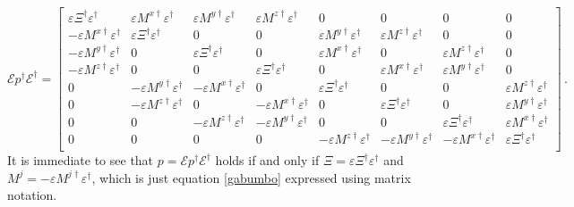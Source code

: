\documentclass[a4paper, amsfonts, amssymb, amsmath, reprint, showkeys, nofootinbib, twoside, onecolumn,notitlepage]{revtex4-1}
\begin{document}
\begin{equation}
\mathcal{E}p^\dagger\mathcal{E}^\dagger = 
\begin{bmatrix}
\varepsilon \Xi^\dagger \varepsilon^\dagger &  \varepsilon M^{x\dagger}\varepsilon^\dagger & \varepsilon M^{y\dagger}\varepsilon^\dagger & \varepsilon M^{z\dagger}\varepsilon^\dagger & 0 & 0 & 0 & 0\\
-\varepsilon M^{x\dagger} \varepsilon^\dagger & \varepsilon \Xi^\dagger \varepsilon^\dagger  & 0 & 0 & \varepsilon M^{y\dagger} \varepsilon^\dagger & \varepsilon M^{z\dagger} \varepsilon^\dagger & 0 & 0\\
-\varepsilon M^{y\dagger} \varepsilon^\dagger & 0 & \varepsilon \Xi^\dagger \varepsilon^\dagger  & 0 & \varepsilon M^{x\dagger} \varepsilon^\dagger & 0 & \varepsilon M^{z\dagger} \varepsilon^\dagger & 0\\
-\varepsilon M^{z\dagger} \varepsilon^\dagger & 0 & 0 & \varepsilon \Xi^\dagger \varepsilon^\dagger  & 0 & \varepsilon M^{x\dagger} \varepsilon^\dagger &  \varepsilon M^{y\dagger} \varepsilon^\dagger & 0\\
0 & -\varepsilon M^{y\dagger} \varepsilon^\dagger & - \varepsilon M^{x\dagger} \varepsilon^\dagger & 0 & \varepsilon \Xi^\dagger \varepsilon^\dagger  & 0 & 0 & \varepsilon M^{z\dagger} \varepsilon^\dagger \\
0 & -\varepsilon M^{z\dagger} \varepsilon^\dagger & 0 & -\varepsilon M^{x\dagger} \varepsilon^\dagger & 0 & \varepsilon \Xi^\dagger \varepsilon^\dagger  & 0 &  \varepsilon M^{y\dagger} \varepsilon^\dagger \\
0 & 0 & -\varepsilon M^{z\dagger} \varepsilon^\dagger & -\varepsilon M^{y\dagger} \varepsilon^\dagger & 0 & 0 & \varepsilon \Xi^\dagger \varepsilon^\dagger  & \varepsilon M^{x\dagger} \varepsilon^\dagger\\
0 & 0 & 0 & 0 & -\varepsilon M^{z\dagger} \varepsilon^\dagger &  -\varepsilon M^{y\dagger} \varepsilon^\dagger & -\varepsilon M^{x\dagger} \varepsilon^\dagger & \varepsilon \Xi^\dagger \varepsilon^\dagger \\
\end{bmatrix} \, .
\end{equation}
It is immediate to see that $p=\mathcal{E}p^\dagger\mathcal{E}^\dagger$ holds if and only if $\Xi=\varepsilon \Xi^\dagger \varepsilon^\dagger$ and  $ M^j=-\varepsilon M^{j\dagger} \varepsilon^\dagger$, which is just equation \eqref{gabumbo} expressed using matrix notation. 
\end{document}
